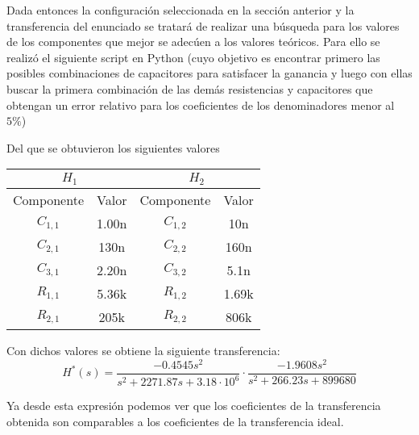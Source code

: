 Dada entonces la configuración seleccionada en la sección anterior y la transferencia del enunciado se tratará de realizar una búsqueda para los valores de los componentes que mejor se adecúen a los valores teóricos. Para ello se realizó el siguiente script en Python (cuyo objetivo es encontrar primero las posibles combinaciones de capacitores para satisfacer la ganancia y luego con ellas buscar la primera combinación de las demás resistencias y capacitores que obtengan un error relativo para los coeficientes de los denominadores menor al $5\%$) 


Del que se obtuvieron los siguientes valores

\begin{table}[!h]
\centering
\begin{tabular}{|c|c|c|c|}
\hline
\multicolumn{2}{|c|}{$H_{1}$} & \multicolumn{2}{c|}{$H_{2}$} \\ \hline
Componente       & Valor      & Componente      & Valor      \\ \hline
$C_{1,1}$        & 1.00n       & $C_{1,2}$       & 10n       \\ \hline
$C_{2,1}$        & 130n       & $C_{2,2}$       & 160n       \\ \hline
$C_{3,1}$        & 2.20n       & $C_{3,2}$       & 5.1n       \\ \hline
$R_{1,1}$        & 5.36k       & $R_{1,2}$       & 1.69k       \\ \hline
$R_{2,1}$        & 205k         & $R_{2,2}$       & 806k         \\ \hline
\end{tabular}
\end{table}

Con dichos valores se obtiene la siguiente transferencia:
$$
    H^{*}(s) = \frac{-0.4545s^2}{s^2 + 2271.87s + 3.18 \cdot 10^{6}} \cdot \frac{-1.9608s^2}{s^2 + 266.23s + 899680}
$$

Ya desde esta expresión podemos ver que los coeficientes de la transferencia obtenida son comparables a los coeficientes de la transferencia ideal.